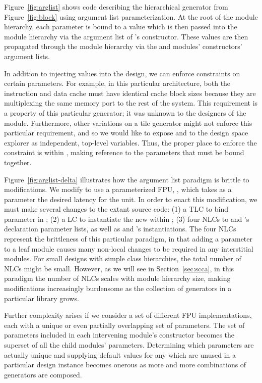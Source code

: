 Figure~\ref{fig:arglist} shows code describing the hierarchical  generator from Figure~\ref{fig:block} using argument list parameterization.
At the root of the module hierarchy, each parameter is bound to a value which is then passed into the module hierarchy via the argument list of 's constructor.
These values are then propagated through the module hierarchy via the  and  modules' constructors' argument lists.

In addition to injecting values into the design, we can enforce constraints on certain parameters.
For example, in this particular  architecture, both the instruction and data cache must have identical cache block sizes
because they are multiplexing the same memory port to the rest of the system.
This requirement is a property of this particular  generator; it was unknown to the designers of the  module.
Furthermore, other variations on a tile generator might not enforce this particular requirement, and so we would like to expose
 and  to the design space explorer as independent, top-level variables.
Thus, the proper place to enforce the constraint is within , making reference to the parameters that must be bound together.

Figure~\ref{fig:arglist-delta} illustrates how the argument list paradigm is brittle to modifications. 
We modify  to use a parameterized FPU, , which takes as a parameter the desired latency for the unit.
In order to enact this modification, we must make several changes to the extant source code:
(1) a TLC to bind parameter  in ;
(2) a LC to instantiate the new  within ;
(3) four NLCs to  and 's declaration parameter lists, as well as  and 's instantiations.
The four NLCs represent the brittleness of this particular paradigm, in that adding a parameter to a leaf module causes many non-local changes to be required in any interstitial modules.
For small designs with simple class hierarchies, the total number of NLCs might be small.
However, as we will see in Section~\ref{sec:scca}, in this paradigm the number of NLCs scales with module hierarchy size, making modifications increasingly burdensome
as the collection of generators in a particular library grows.

Further complexity arises if we consider a set of different FPU implementations, each with a unique or even partially overlapping set of parameters.
The set of parameters included in each intervening module's constructor becomes the superset of all the child modules' parameters.
Determining which parameters are actually unique and supplying default values for any which are unused in a particular design instance becomes onerous
as more and more combinations of generators are composed.


